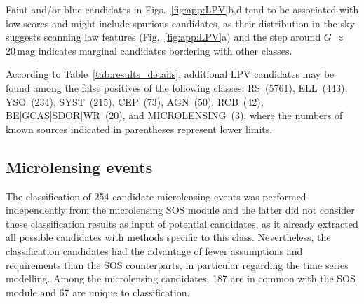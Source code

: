 \documentclass[longauth]{aa}
\def\g{$G$\xspace}
\begin{document}
Faint and/or blue candidates in Figs.~\ref{fig:app:LPV}b,d tend to be associated with low scores and might include spurious candidates, as their distribution in the sky suggests scanning law features (Fig.~\ref{fig:app:LPV}a) and the step around \g\,$\approx$\,20\,mag indicates marginal candidates bordering with other classes. 


According to Table~\ref{tab:results_details}, additional LPV candidates may be found among the false positives of the following classes: RS~(5761), ELL~(443), YSO~(234),  SYST~(215),  CEP~(73),  AGN~(50), RCB~(42), BE|GCAS|SDOR|WR~(20), and MICROLENSING~(3),  where the numbers of known sources indicated in parentheses represent lower limits.



\subsection{Microlensing events\label{ssec:microlensing}}

The classification of 254 candidate microlensing events was performed independently from the microlensing SOS module \citep{DR3-DPACP-166} and the latter did not consider these classification results as input of potential candidates, as it already extracted all possible candidates with methods specific to this class. 
Nevertheless, the classification candidates had the advantage of fewer assumptions and requirements than the SOS counterparts, in particular regarding the time series modelling.
Among the microlensing candidates, 187 are in common with the SOS module and 67 are unique to classification.
\end{document}
